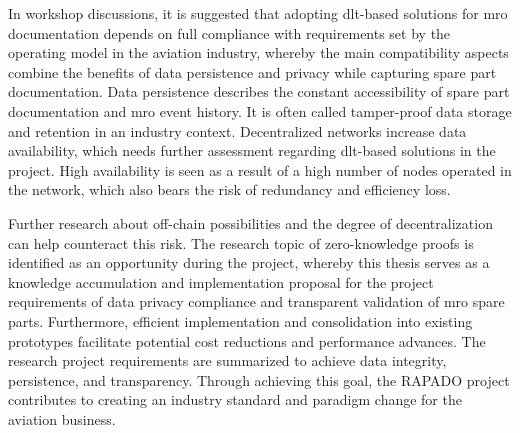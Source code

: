 \begin{comment}
- hier die Opremic slides einarbeiten
- die use cases definieren (Bastis part)
\end{comment}
In workshop discussions, it is suggested that adopting \acrshort{dlt}-based solutions for \acrshort{mro} documentation depends on full compliance with requirements set by the operating model in the aviation industry, whereby the main compatibility aspects combine the benefits of data persistence and privacy while capturing spare part documentation. Data persistence describes the constant accessibility of spare part documentation and \acrshort{mro} event history. It is often called tamper-proof data storage and retention in an industry context. Decentralized networks increase data availability, which needs further assessment regarding \acrshort{dlt}-based solutions in the project. High availability is seen as a result of a high number of nodes operated in the network, which also bears the risk of redundancy and efficiency loss.

Further research about off-chain possibilities and the degree of decentralization can help counteract this risk. The research topic of zero-knowledge proofs is identified as an opportunity during the project, whereby this thesis serves as a knowledge accumulation and implementation proposal for the project requirements of data privacy compliance and transparent validation of \acrshort{mro} spare parts. Furthermore, efficient implementation and consolidation into existing prototypes facilitate potential cost reductions and performance advances. The research project requirements are summarized to achieve data integrity, persistence, and transparency. Through achieving this goal, the RAPADO project contributes to creating an industry standard and paradigm change for the aviation business.



\begin{comment}
-go thru zedel kliewer and list principles, say that zkps were one solution criteria mentioned already
-look further to semester project intros: 
(i) High speed of the system to not intervene with processes of part usage.
(ii) Consolidation of parts and certificates from different sources.
(iii) Persistence of data while operating in a trust-free and permission-based environment to secure anti-counterfeiting and confidentiality.

next:
-security and privacy
-transparency
- concepts for privacy identified: ZKP as one outcome of previous research for future research
- for this, three main requirements resulted: 1)knowledge accumulation 2)privacy vs transparency 3)digitization and data formats fit for purpose
--> use backings from project literature used also in semester project and jans publication
\end{comment}

